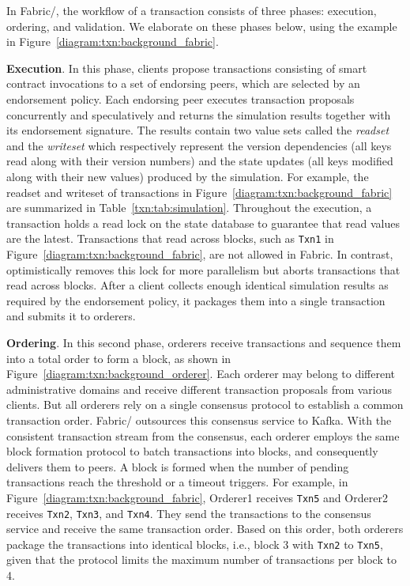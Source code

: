 In Fabric/{\fabricPlusplus}, the workflow of a transaction consists of three phases:
execution, ordering, and validation.
%
We elaborate on these phases below, using the example in
Figure~\ref{diagram:txn:background_fabric}.

\textbf{Execution}. In this phase, clients propose transactions
  consisting of smart contract invocations to a set of endorsing peers,
  which are selected by an endorsement policy.
  Each endorsing peer executes transaction proposals concurrently and
  speculatively and returns the simulation results together with its endorsement
  signature.
  The results contain two value sets called the \textit{readset} and the
  \textit{writeset} which respectively represent the version dependencies (all
  keys read along with their version numbers) and the state updates (all keys
  modified along with their new values) produced by the simulation.
  For example, the readset and writeset of transactions in
  Figure~\ref{diagram:txn:background_fabric} are summarized in Table~\ref{txn:tab:simulation}.
  Throughout the execution, a transaction holds a read lock on the
  state database to guarantee that read values are the latest.
  Transactions that read across blocks, such as \texttt{Txn1} in
  Figure~\ref{diagram:txn:background_fabric}, are not allowed in Fabric.
  In contrast, {\fabricPlusplus} optimistically removes this lock for more parallelism but aborts transactions that read across blocks.
  After a client collects enough identical simulation results as required
  by the endorsement policy, it packages them into a single transaction and
  submits it to orderers.

\textbf{Ordering}. In this second phase, orderers receive
  transactions and sequence them into a total order to form a block, 
  as shown in Figure~\ref{diagram:txn:background_orderer}.
  Each orderer may belong to different administrative domains and receive different transaction proposals from various clients. 
  But all orderers rely on a single consensus protocol to establish a common transaction order.
  Fabric/{\fabricPlusplus} outsources this consensus service to Kafka. 
  With the consistent transaction stream from the consensus, each orderer employs the same block formation protocol to batch transactions into blocks, and consequently delivers them to peers.  
  A block is formed when the number of pending transactions reach the threshold or a timeout triggers. 
  For example, in Figure~\ref{diagram:txn:background_fabric}, Orderer1 receives \texttt{Txn5} and Orderer2 receives \texttt{Txn2},  \texttt{Txn3}, and \texttt{Txn4}. 
  They send the transactions to the consensus service and receive the same transaction order. 
  Based on this order, both orderers package the transactions into identical blocks, i.e., block 3 with  \texttt{Txn2} to  \texttt{Txn5}, given that the protocol limits the maximum number of transactions per block to 4. 
  

